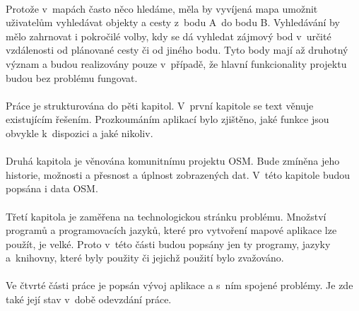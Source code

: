 \documentclass[11pt,a4paper,titlepage,oneside]{book}
\begin{document}
	\paragraph{} Protože v~mapách často něco hledáme, měla by vyvíjená mapa umožnit uživatelům vyhledávat objekty a cesty z~bodu A~do bodu B. Vyhledávání by mělo zahrnovat i pokročilé volby, kdy se dá vyhledat zájmový bod v~určité vzdálenosti od plánované cesty či od jiného bodu. Tyto body mají až druhotný význam a budou realizovány pouze v~případě, že hlavní funkcionality projektu budou bez problému fungovat.






	\paragraph{} Práce je strukturována do pěti kapitol. V~první kapitole se text věnuje existujícím řešením. Prozkoumáním aplikací bylo zjištěno, jaké funkce jsou obvykle k~dispozici a jaké nikoliv.
	\paragraph{} Druhá kapitola je věnována  komunitnímu projektu \ac{OSM}. Bude zmíněna jeho historie, možnosti a přesnost a úplnost zobrazených dat. V~této kapitole budou popsána i data \ac{OSM}. 
	\paragraph{}Třetí kapitola je zaměřena na technologickou stránku problému. Množství programů a programovacích jazyků, které pro vytvoření mapové aplikace lze použít, je velké. Proto v~této části budou popsány jen ty programy, jazyky a~knihovny, které byly použity či  jejichž použití bylo zvažováno.
	\paragraph{}Ve čtvrté části práce je popsán vývoj aplikace a s~ním spojené problémy. Je zde také její stav v~době odevzdání práce. 
\end{document}

